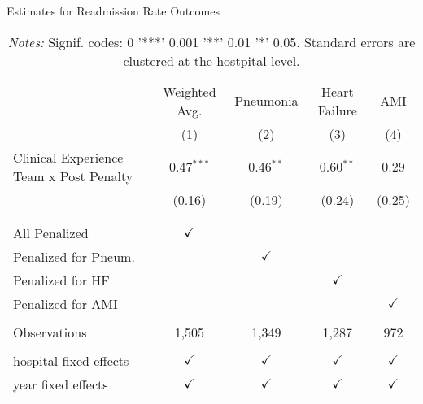 \begin{table}[ht!]
\caption{Estimates for Readmission Rate Outcomes}
\begin{tabular}{lcccc}
\toprule
 & Weighted Avg. & Pneumonia & Heart Failure & AMI\\
 & (1) & (2) & (3) & (4)\\
\midrule Clinical Experience Team x Post Penalty & 0.47$^{***}$ & 0.46$^{**}$ & 0.60$^{**}$ & 0.29\\
  & (0.16) & (0.19) & (0.24) & (0.25)\\
  \\
  \\
All Penalized & $\checkmark$ &  &  & \\
Penalized for Pneum. &  & $\checkmark$ &  & \\
Penalized for HF &  &  & $\checkmark$ & \\
Penalized for AMI &  &  &  & $\checkmark$\\
  &   &   &   &  \\
Observations & 1,505 & 1,349 & 1,287 & 972\\
  &   &   &   &  \\
hospital fixed effects & $\checkmark$ & $\checkmark$ & $\checkmark$ & $\checkmark$\\
year fixed effects & $\checkmark$ & $\checkmark$ & $\checkmark$ & $\checkmark$\\
\bottomrule
\end{tabular}
\label{tab:mainresults}
\caption*{\footnotesize{\textit{Notes:} Signif. codes:  0 '***' 0.001 '**' 0.01 '*' 0.05. Standard errors are clustered at the hostpital level.}}
\end{table} 